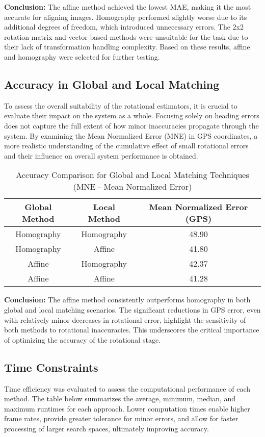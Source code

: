 \textbf{Conclusion:} The affine method achieved the lowest MAE, making it the most accurate for aligning images. Homography performed slightly worse due to its additional degrees of freedom, which introduced unnecessary errors. The 2x2 rotation matrix and vector-based methods were unsuitable for the task due to their lack of transformation handling complexity. Based on these results, affine and homography were selected for further testing.

\subsection{Accuracy in Global and Local Matching}
To assess the overall suitability of the rotational estimators, it is crucial to evaluate their impact on the system as a whole. Focusing solely on heading errors does not capture the full extent of how minor inaccuracies propagate through the system. By examining the Mean Normalized Error (MNE) in GPS coordinates, a more realistic understanding of the cumulative effect of small rotational errors and their influence on overall system performance is obtained.

\begin{table}[H]
    \centering
    \begin{tabular}{|c|c|c|}
        \hline
        \textbf{Global Method} & \textbf{Local Method} & \textbf{Mean Normalized Error (GPS)} \\  
        \hline
        Homography & Homography & 48.90 \\  
        Homography & Affine & 41.80 \\  
        Affine & Homography & 42.37 \\  
        Affine & Affine & 41.28 \\  
        \hline
    \end{tabular}
    \caption{Accuracy Comparison for Global and Local Matching Techniques (MNE - Mean Normalized Error)}
\end{table}

\textbf{Conclusion:} The affine method consistently outperforms homography in both global and local matching scenarios. The significant reductions in GPS error, even with relatively minor decreases in rotational error, highlight the sensitivity of both methods to rotational inaccuracies. This underscores the critical importance of optimizing the accuracy of the rotational stage.


\subsection{Time Constraints}
Time efficiency was evaluated to assess the computational performance of each method. The table below summarizes the average, minimum, median, and maximum runtimes for each approach. Lower computation times enable higher frame rates, provide greater tolerance for minor errors, and allow for faster processing of larger search spaces, ultimately improving accuracy.



